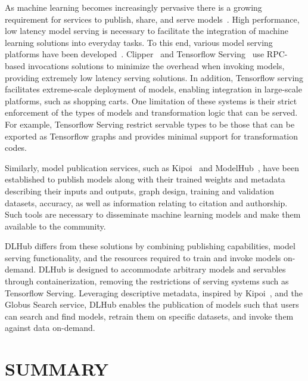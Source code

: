 \documentclass{aip-cp}
\newcommand\ryan[1]{}
\newcommand\ryan[1]{{\color{green}[Ryan: #1]}}
\begin{document}

As machine learning becomes 
increasingly pervasive there is a growing requirement for services to publish, share, and serve 
models~\cite{kumar2017data}. High performance, low latency 
model serving is necessary to facilitate the integration of machine learning solutions into 
everyday tasks. To this end, various model serving platforms have been 
developed~\cite{crankshaw2014missing,crankshaw2017clipper, tfserving, awssagemaker}. Clipper~\cite{crankshaw2017clipper} and 
Tensorflow Serving~\cite{tfserving} use RPC-based invocations solutions to minimize the overhead 
when invoking models, providing extremely low latency serving solutions. In addition, Tensorflow 
serving facilitates extreme-scale deployment of models, enabling integration in large-scale 
platforms, such as shopping carts. One limitation of these systems is their strict enforcement of 
the types of models and transformation logic that can be served. For example, Tensorflow Serving 
restrict servable types to be those that can be exported as Tensorflow graphs and provides minimal 
support for transformation codes.

Similarly, model publication services, such as Kipoi~\cite{kipoi} and 
ModelHub~\cite{miao2017towards}, have been established to publish models along with their trained 
weights and metadata describing their inputs and outputs, graph design, training and 
validation datasets, accuracy, as well as information relating to citation and authorship. Such 
tools are necessary to disseminate machine learning models and make them available to the 
community.

DLHub differs from these solutions by combining publishing capabilities, model serving 
functionality, and the resources required to train and invoke models on-demand. DLHub is designed 
to accommodate arbitrary models and servables through containerization, removing the restrictions 
of serving systems such as Tensorflow Serving. Leveraging descriptive metadata, inspired by 
Kipoi~\cite{kipoi}, and the Globus Search service, DLHub enables the publication of models such 
that users can search and find models, retrain them on specific datasets, and invoke them against 
data on-demand. 


\section{SUMMARY}
\end{document}

